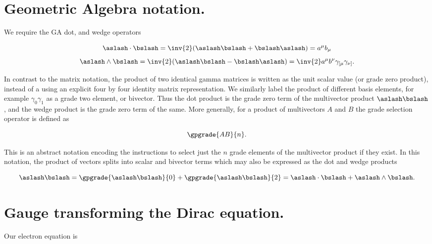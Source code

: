 \section{Geometric Algebra notation.}

We require the GA dot, and wedge operators

\begin{equation}\label{eqn:diracCovariant:70}
\aslash \cdot \bslash = \inv{2}( \aslash \bslash + \bslash \aslash ) = a^\mu b_\mu
\end{equation}
\begin{equation}\label{eqn:diracCovariant:90}
\aslash \wedge \bslash = \inv{2}( \aslash \bslash - \bslash \aslash ) = \inv{2} a^\mu b^\nu \gamma_{[\mu} \gamma_{\nu]}.
\end{equation}

In contrast to the matrix notation, the product of two identical gamma matrices is written as the unit scalar value (or grade zero product), instead of a using an explicit four by four identity matrix representation.  We similarly label the product of different basis elements, for example $\gamma_0 \gamma_1$ as a grade two element, or bivector.  Thus the dot product is the grade zero term of the multivector product $\aslash \bslash$, and the wedge product is the grade zero term of the same.  More generally, for a product of multivectors $A$ and $B$ the grade selection operator is defined as

\begin{equation}\label{eqn:diracCovariant:110}
\gpgrade{A B}{n}.
\end{equation}

This is an abstract notation encoding the instructions to select just the $n$ grade elements of the multivector product if they exist.  In this notation, the product of vectors splits into scalar and bivector terms which may also be expressed as the dot and wedge products

\begin{equation}\label{eqn:diracCovariant:130}
\aslash \bslash = \gpgrade{\aslash \bslash}{0} + \gpgrade{\aslash \bslash}{2} = \aslash \cdot \bslash + \aslash \wedge \bslash.
\end{equation}

\section{Gauge transforming the Dirac equation.}

Our electron equation is

